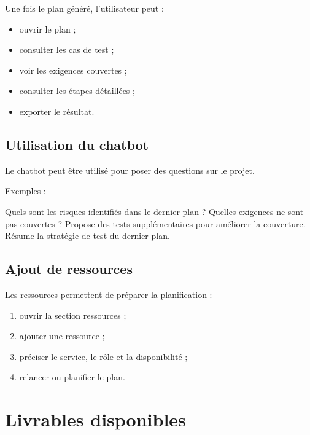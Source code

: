 \documentclass[
  french,
]{report}
\newenvironment{Shaded}{}{}
\newcommand{\NormalTok}[1]{#1}
\providecommand{\tightlist}{%
  \setlength{\itemsep}{0pt}\setlength{\parskip}{0pt}}
\begin{document}
Une fois le plan généré, l'utilisateur peut :

\begin{itemize}
\tightlist
\item
  ouvrir le plan ;
\item
  consulter les cas de test ;
\item
  voir les exigences couvertes ;
\item
  consulter les étapes détaillées ;
\item
  exporter le résultat.
\end{itemize}

\section{Utilisation du chatbot}\label{utilisation-du-chatbot}

Le chatbot peut être utilisé pour poser des questions sur le projet.

Exemples :

\begin{Shaded}
\begin{Highlighting}[]
\NormalTok{Quels sont les risques identifiés dans le dernier plan ?}
\NormalTok{Quelles exigences ne sont pas couvertes ?}
\NormalTok{Propose des tests supplémentaires pour améliorer la couverture.}
\NormalTok{Résume la stratégie de test du dernier plan.}
\end{Highlighting}
\end{Shaded}

\section{Ajout de ressources}\label{ajout-de-ressources}

Les ressources permettent de préparer la planification :

\begin{enumerate}
\def\labelenumi{\arabic{enumi}.}
\tightlist
\item
  ouvrir la section ressources ;
\item
  ajouter une ressource ;
\item
  préciser le service, le rôle et la disponibilité ;
\item
  relancer ou planifier le plan.
\end{enumerate}

\chapter{Livrables disponibles}\label{livrables-disponibles}
\end{document}
